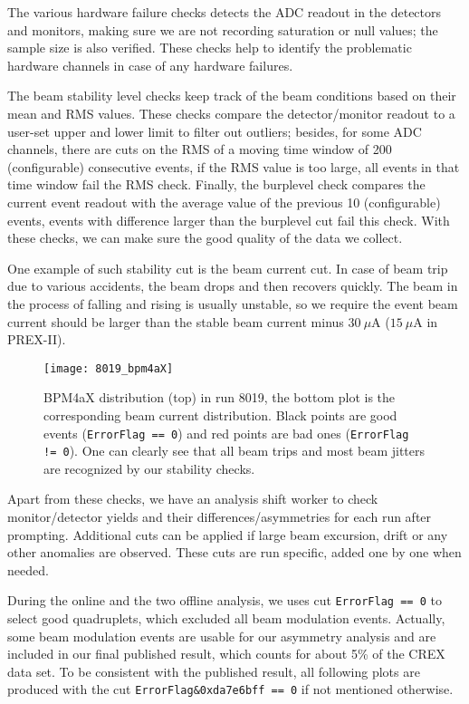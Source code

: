 The various hardware failure checks detects the ADC readout in the detectors and
monitors, making sure we are not recording saturation or null values; the 
sample size is also verified. These checks help to identify the problematic
hardware channels in case of any hardware failures.

The beam stability level checks keep track of the beam conditions based on their
mean and RMS values. These checks compare the detector/monitor readout to 
a user-set upper and lower limit to filter out outliers; besides, for some ADC 
channels, there are cuts on the RMS of a moving time window of 200 (configurable) %
consecutive events, if the RMS value is too large, 
all events in that time window fail the RMS check. 
Finally, the burplevel check compares the current event readout with the average
value of the previous 10 (configurable) events, events with difference larger than
the burplevel cut fail this check. With these checks, we can make sure the good 
quality of the data we collect.

One example of such stability cut is the beam current cut. In case of beam trip
due to various accidents, the beam drops and then recovers quickly. The beam in
the process of falling and rising is usually unstable, so we require the event
beam current should be larger than the stable beam current minus $30\ \mu$A ($15\ \mu$A in PREX-II).

\begin{figure}[!h]
    \centering
    \texttt{[image: 8019\_bpm4aX]}
    \caption{BPM4aX distribution (top) in run 8019, the bottom plot is the corresponding
    beam current distribution. Black points are good events (\texttt{ErrorFlag == 0}) 
    and red points are bad ones (\texttt{ErrorFlag != 0}). 
    One can clearly see that all beam trips and most beam jitters are recognized 
    by our stability checks.}
\end{figure}

Apart from these checks, we have an analysis shift worker to check monitor/detector 
yields and their differences/asymmetries for each run after prompting. Additional
cuts can be applied if large beam excursion, drift or any other anomalies are observed. 
These cuts are run specific, added one by one when needed.

During the online and the two offline analysis, we uses cut \verb|ErrorFlag == 0|
to select good quadruplets, which excluded all beam modulation events. Actually, 
some beam modulation events are usable for our asymmetry analysis and are
included in our final published result, which counts for about 5\% of the CREX data set.
To be consistent with the published result, all following plots are produced with the cut 
\verb|ErrorFlag&0xda7e6bff == 0| if not mentioned otherwise. 

